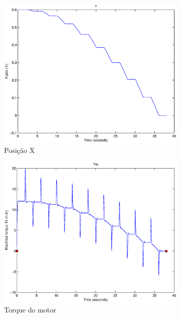\documentclass{article}
\begin{document}
\begin{figure}[H]
\begin{subfigure}{0.3\textwidth}
		\includegraphics[width=\linewidth]{matlab/x6}
		\caption{Posição X}
	\end{subfigure}
	\begin{subfigure}{0.3\textwidth}
		\includegraphics[width=\linewidth]{matlab/tm6}
		\caption{Torque do motor}
	\end{subfigure}
	\begin{subfigure}{0.3\textwidth}

\end{subfigure}
\end{figure}
\end{document}
